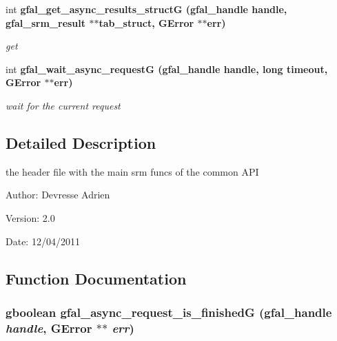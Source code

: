 \begin{CompactItemize}
int \bf{gfal\_\-get\_\-async\_\-results\_\-struct\-G} (gfal\_\-handle handle, gfal\_\-srm\_\-result $\ast$$\ast$tab\_\-struct, GError $\ast$$\ast$err)
\begin{CompactList}\small\item\em get \item\end{CompactList}\item 
int \bf{gfal\_\-wait\_\-async\_\-request\-G} (gfal\_\-handle handle, long timeout, GError $\ast$$\ast$err)
\begin{CompactList}\small\item\em wait for the current request \item\end{CompactList}\end{CompactItemize}


\subsection{Detailed Description}
the header file with the main srm funcs of the common API 

\begin{Desc}
\item[Author:]Devresse Adrien \end{Desc}
\begin{Desc}
\item[Version:]2.0 \end{Desc}
\begin{Desc}
\item[Date:]12/04/2011 \end{Desc}


\subsection{Function Documentation}
\subsubsection{\setlength{\rightskip}{0pt plus 5cm}gboolean gfal\_\-async\_\-request\_\-is\_\-finished\-G (gfal\_\-handle {\em handle}, GError $\ast$$\ast$ {\em err})}\label{gfal__common__srm_8h_b628e9ad3599f656f022f9101020f519}


